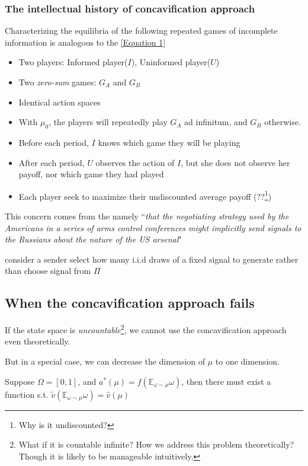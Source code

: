 \documentclass[12pt,letterpaper]{article}
\theoremstyle{definition}   %
\begin{document}
\subsubsection*{The intellectual history of concavification approach}

Characterizing the equilibria of the following repeated games of incomplete information is analogous to the \autoref{Equation 1} \citep{aumann1966game}
\begin{itemize}
	\item Two players: {Informed player($I$), Uninformed player($U$)}
	\item Two \emph{zero-sum} games: $G_A$ and $G_B$
	\item Identical action spaces
	\item With $\mu_0$, the players will repeatedly play $G_A$ ad infinitum, and $G_B$ otherwise.
	\item Before each period, $I$ knows which game they will be playing
	\item After each period, $U$ observes the action of $I$, but she does not observe her payoff, nor which game they had played
	\item Each player seek to maximize their undiscounted average payoff (??\footnote{Why is it undiscounted?})
\end{itemize}

This concern comes from the namely ``\textit{that the negotiating strategy used by the Americans in a series of arms control
conferences might implicitly send signals to the Russians about the nature of the US arsenal}"

\cite{brocas2007influence} consider a sender select how many i.i.d draws of a fixed signal to generate rather than choose signal from $\Pi$ 

\subsection{When the concavification approach fails}

If the state space is \textit{uncountable}\footnote{What if it is countable infinite? How we address this problem theoretically? Though it is likely to be manageable intuitively.}, we cannot use the concavification approach even theoretically.

But in a special case, we can decrease the dimension of $\mu$ to one dimension.

Suppose $\Omega = [0, 1]$, and $a^*(\mu) = f(\mathbb{E}_{\omega \sim \mu} \omega)$, then there must exist a function s.t. $\tilde{v}(\mathbb{E}_{\omega \sim \mu} \omega) = \hat{v}(\mu)$
\end{document}
